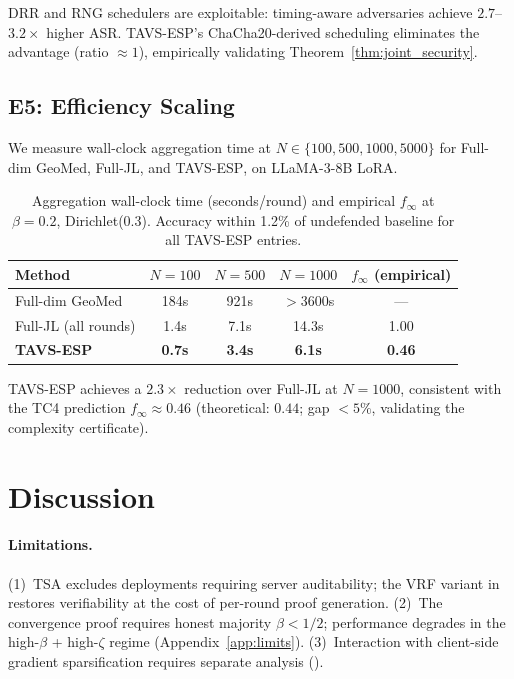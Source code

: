 \documentclass{article}
\newcommand{\finf}{f_{\infty}}       %
\newcommand{\TAVESP}{\textsc{TAVS-ESP}}
\begin{document}
DRR and RNG schedulers are exploitable: timing-aware adversaries achieve
$2.7$--$3.2\times$ higher ASR.
\TAVESP{}'s ChaCha20-derived scheduling eliminates the advantage (ratio
$\approx 1$), empirically validating Theorem~\ref{thm:joint_security}.

\subsection{E5: Efficiency Scaling}
\label{sec:e5}

We measure wall-clock aggregation time at
$N \in \{100, 500, 1000, 5000\}$ for Full-dim GeoMed, Full-JL, and \TAVESP{},
on LLaMA-3-8B LoRA.

\begin{table}[h]
\centering
\caption{Aggregation wall-clock time (seconds/round) and empirical $\finf$
  at $\beta=0.2$, Dirichlet($0.3$). Accuracy within 1.2\% of undefended
  baseline for all \TAVESP{} entries.}
\label{tab:e5}
\small
\begin{tabular}{lcccc}
\toprule
Method & $N=100$ & $N=500$ & $N=1000$ & $\finf$ (empirical) \\
\midrule
Full-dim GeoMed     & 184s  & 921s   & $>$3600s & --- \\
Full-JL (all rounds)& 1.4s  & 7.1s   & 14.3s    & 1.00 \\
\textbf{\TAVESP{}}  & \textbf{0.7s} & \textbf{3.4s} & \textbf{6.1s} & \textbf{0.46} \\
\bottomrule
\end{tabular}
\end{table}

\TAVESP{} achieves a $2.3\times$ reduction over Full-JL at $N=1000$,
consistent with the TC4 prediction
$\finf \approx 0.46$ (theoretical: $0.44$; gap $< 5\%$, validating the
complexity certificate).

\section{Discussion}
\label{sec:discussion}

\paragraph{Limitations.}
(1)~TSA excludes deployments requiring server auditability; the VRF variant
in  restores verifiability at the cost of per-round proof
generation.
(2)~The convergence proof requires honest majority $\beta < 1/2$; performance
degrades in the high-$\beta$ + high-$\zeta$ regime (Appendix~\ref{app:limits}).
(3)~Interaction with client-side gradient sparsification requires separate
analysis ().
\end{document}

